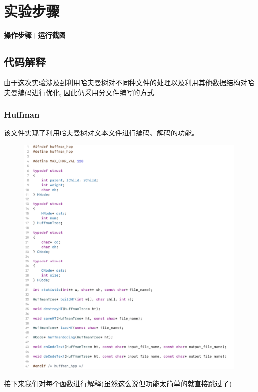 \section{实验步骤}
    \textbf{操作步骤+运行截图}
    \subsection{代码解释}
        \par 由于这次实验涉及到利用哈夫曼树对不同种文件的处理以及利用其他数据结构对哈夫曼编码进行优化, 因此仍采用分文件编写的方式.
        \subsubsection{Huffman}
            \par 该文件实现了利用哈夫曼树对文本文件进行编码、解码的功能。
            \begin{figure}[htbp]
                \hspace*{1.2cm}
                \includegraphics*[width = 14cm]{s0_0.png}
            \end{figure}
            \par 接下来我们对每个函数进行解释(虽然这么说但功能太简单的就直接跳过了)
